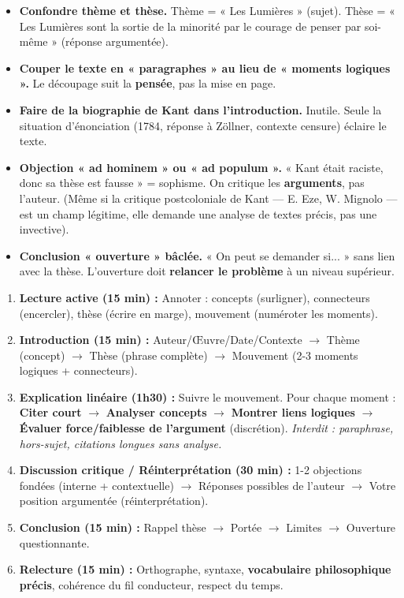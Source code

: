 \documentclass[11pt]{article}
\begin{document}
\begin{attention}
\begin{itemize}
    \item \textbf{Confondre thème et thèse.} Thème = « Les Lumières » (sujet). Thèse = « Les Lumières sont la sortie de la minorité par le courage de penser par soi-même » (réponse argumentée).
    \item \textbf{Couper le texte en « paragraphes » au lieu de « moments logiques ».} Le découpage suit la \textbf{pensée}, pas la mise en page.
    \item \textbf{Faire de la biographie de Kant dans l'introduction.} Inutile. Seule la situation d'énonciation (1784, réponse à Zöllner, contexte censure) éclaire le texte.
    \item \textbf{Objection « ad hominem » ou « ad populum ».} « Kant était raciste, donc sa thèse est fausse » = sophisme. On critique les \textbf{arguments}, pas l'auteur. (Même si la critique postcoloniale de Kant — E. Eze, W. Mignolo — est un champ légitime, elle demande une analyse de textes précis, pas une invective).
    \item \textbf{Conclusion « ouverture » bâclée.} « On peut se demander si... » sans lien avec la thèse. L'ouverture doit \textbf{relancer le problème} à un niveau supérieur.
\end{itemize}
\end{attention}

\begin{methode}
\begin{enumerate}
    \item \textbf{Lecture active (15 min) :} Annoter : concepts (surligner), connecteurs (encercler), thèse (écrire en marge), mouvement (numéroter les moments).
    \item \textbf{Introduction (15 min) :} Auteur/Œuvre/Date/Contexte $\rightarrow$ Thème (concept) $\rightarrow$ Thèse (phrase complète) $\rightarrow$ Mouvement (2-3 moments logiques + connecteurs).
    \item \textbf{Explication linéaire (1h30) :} Suivre le mouvement. Pour chaque moment : \textbf{Citer court} $\rightarrow$ \textbf{Analyser concepts} $\rightarrow$ \textbf{Montrer liens logiques} $\rightarrow$ \textbf{Évaluer force/faiblesse de l'argument} (discrétion). \textit{Interdit : paraphrase, hors-sujet, citations longues sans analyse.}
    \item \textbf{Discussion critique / Réinterprétation (30 min) :} 1-2 objections fondées (interne + contextuelle) $\rightarrow$ Réponses possibles de l'auteur $\rightarrow$ Votre position argumentée (réinterprétation).
    \item \textbf{Conclusion (15 min) :} Rappel thèse $\rightarrow$ Portée $\rightarrow$ Limites $\rightarrow$ Ouverture questionnante.
    \item \textbf{Relecture (15 min) :} Orthographe, syntaxe, \textbf{vocabulaire philosophique précis}, cohérence du fil conducteur, respect du temps.
\end{enumerate}
\end{methode}
\end{document}
